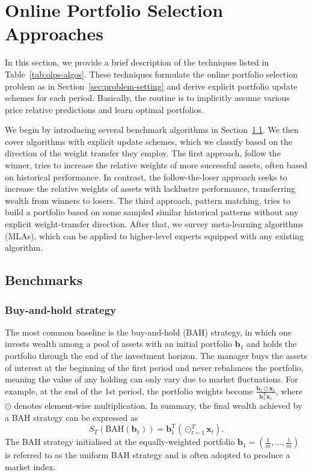 \section{Online Portfolio Selection Approaches}
\label{sec:olps-approaches}

In this section, we provide a brief description of the techniques listed in Table~\ref{tab:olps-algos}. These techniques formulate the online portfolio selection problem as in Section~\ref{sec:problem-setting} and derive explicit portfolio update schemes for each period. Basically, the routine is to implicitly assume various price relative predictions and learn optimal portfolios.

We begin by introducing several benchmark algorithms in Section~\ref{sec:benchmarks}. We then cover algorithms with explicit update schemes, which we classify based on the direction of the weight transfer they employ. The first approach, follow the winner, tries to increase the relative weights of more successful assets, often based on historical performance. In contrast, the follow-the-loser approach seeks to increase the relative weights of assets with lacklustre performance, transferring wealth from winners to losers. The third approach, pattern matching, tries to build a portfolio based on some sampled similar historical patterns without any explicit weight-transfer direction. After that, we survey meta-learning algorithms (MLAs), which can be applied to higher-level experts equipped with any existing algorithm.

\subsection{Benchmarks}
\label{sec:benchmarks}

\subsubsection{Buy-and-hold strategy}

The most common baseline is the buy-and-hold (BAH) strategy, in which one invests wealth among a pool of assets with an initial portfolio $\mathbf{b}_1$  and holds the portfolio through the end of the investment horizon. The manager buys the assets of interest at the beginning of the first period and never rebalances the portfolio, meaning the value of any holding can only vary due to market fluctuations. For example, at the end of the 1st period, the portfolio weights become $\frac{\mathbf{b}_1 \odot \mathbf{x}_1}{\mathbf{b}_1^\text{T}\mathbf{x}_1}$, where $\odot$ denotes element-wise multiplication. In summary, the final wealth achieved by a BAH strategy can be expressed as
\begin{equation}
	S_{T}(\mathrm{BAH}(\mathbf{b}_1)) = \mathbf{b}_1^\text{T} \left(\odot_{t=1}^T \mathbf{x}_t\right).
\end{equation}
The BAH strategy initialised at the equally-weighted portfolio $\mathbf{b}_1 = (\frac{1}{m}, \ldots, \frac{1}{m})$ is referred to as the uniform BAH strategy and is often adopted to produce a market index.

